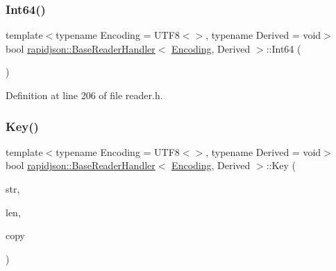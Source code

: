 \subsubsection{\texorpdfstring{Int64()}{Int64()}}
{\footnotesize\ttfamily template$<$typename Encoding = U\+T\+F8$<$$>$, typename Derived = void$>$ \\
bool \mbox{\hyperlink{structrapidjson_1_1_base_reader_handler}{rapidjson\+::\+Base\+Reader\+Handler}}$<$ \mbox{\hyperlink{classrapidjson_1_1_encoding}{Encoding}}, Derived $>$\+::Int64 (\begin{DoxyParamCaption}\item[{\mbox{\hyperlink{stdint_8h_a414156feea104f8f75b4ed9e3121b2f6}{int64\+\_\+t}}}]{ }\end{DoxyParamCaption})}



Definition at line 206 of file reader.\+h.


\begin{DoxyCode}{0}

\end{DoxyCode}
\mbox{\label{structrapidjson_1_1_base_reader_handler_a92649c2dc3e94e085ee056c17444d418}} 
\subsubsection{\texorpdfstring{Key()}{Key()}}
{\footnotesize\ttfamily template$<$typename Encoding = U\+T\+F8$<$$>$, typename Derived = void$>$ \\
bool \mbox{\hyperlink{structrapidjson_1_1_base_reader_handler}{rapidjson\+::\+Base\+Reader\+Handler}}$<$ \mbox{\hyperlink{classrapidjson_1_1_encoding}{Encoding}}, Derived $>$\+::Key (\begin{DoxyParamCaption}\item[{const \mbox{\hyperlink{structrapidjson_1_1_base_reader_handler_a2932a8ecbb1997dda305f4dbef32ab0d}{Ch}} $\ast$}]{str,  }\item[{\mbox{\hyperlink{namespacerapidjson_a44eb33eaa523e36d466b1ced64b85c84}{Size\+Type}}}]{len,  }\item[{bool}]{copy }\end{DoxyParamCaption})}



